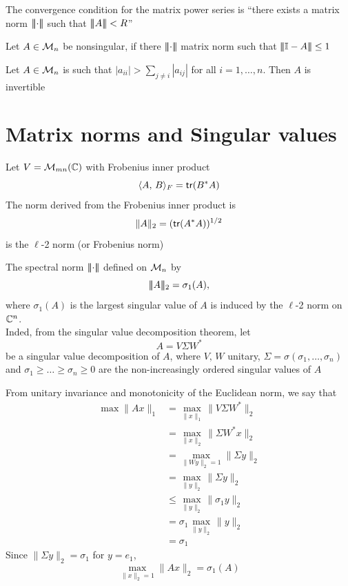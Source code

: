 \documentclass[aspectratio=169]{beamer}
\begin{document}
\begin{frame}
\begin{remark}
 The convergence condition for the matrix power series is ``there exists a matrix norm $\left|\!\left|\!\left|\cdot\right|\!\right|\!\right|$ such that $|\! |\! | A |\! |\! | <R$''
\end{remark}
\vfill
\begin{corollary}
  Let $A\in \mathcal{M}_n$ be nonsingular, if there $\left|\!\left|\!\left|\cdot\right|\!\right|\!\right|$ matrix norm such that $|\! |\! | \mathbb{I}-A|\! |\! | \leq 1$
\end{corollary}
\vfill
\begin{corollary}
  Let $A\in \mathcal{M}_n$ is such that $|a_{ii}| > \sum\limits_{j \neq i} |a_{ij}|$ for all $i = 1, \dots, n$. Then $A$ is invertible
\end{corollary}
\end{frame}



\section{Matrix norms and Singular values}
\label{sec:matrixNorms_SVD}

\begin{frame}
Let $V = \mathcal{M}_{mn}(\mathbb{C})$ with Frobenius inner product 
\[
    \langle A, \, B \rangle_{F}= \mathsf{tr}(B^*A)
\]
The norm derived from the Frobenius inner product is 
\[\|A\|_2= (\mathsf{tr}(A^*A))^{1/2}\]
is the $\ell$-2 norm (or Frobenius norm)
\end{frame}

\begin{frame}
The spectral norm $\left|\!\left|\!\left|\cdot\right|\!\right|\!\right|$ defined on $\mathcal{M}_n$ by 
\[|\! |\! | A|\! |\! |_2= \sigma_1(A),\]
where $\sigma_1(A)$ is the largest singular value of $A$ is induced by the $\ell$-2 norm on $\mathbb{C}^n$. \\
Inded, from the singular value decomposition theorem, let 
\[A= V \Sigma W^*\]
be a singular value decomposition of $A$, where $V, \, W$ unitary, $\Sigma= \sigma(\sigma_1, \dots, \sigma_n)$ and $\sigma_1 \geq \dots \geq \sigma_n\geq 0$ are the non-increasingly ordered singular values of $A$
\end{frame}


\begin{frame}
From unitary invariance and monotonicity of the Euclidean norm, we say that 
\begin{align*}
\max \|Ax\|_1&= \max_{\|x\|_1} \|V\Sigma W^*\|_2\\
&= \max_{\|x\|_2} \|\Sigma W^* x\|_2\\
&= \max_{\|Wy\|_2=1}\|\Sigma y\|_2\\
&= \max_{\|y\|_2}\|\Sigma y\|_2\\
& \leq \max_{\|y\|_2}\|\sigma_1 y\|_2\\
&= \sigma_1 \max_{\| y \|_2} \|y\|_2\\
&= \sigma_1
\end{align*}
Since $\| \Sigma y\|_2= \sigma_1$ for $y= e_1$, 
\[\max_{\|x\|_2=1} \|Ax\|_2= \sigma_1(A)\]
\end{frame}
\end{document}
